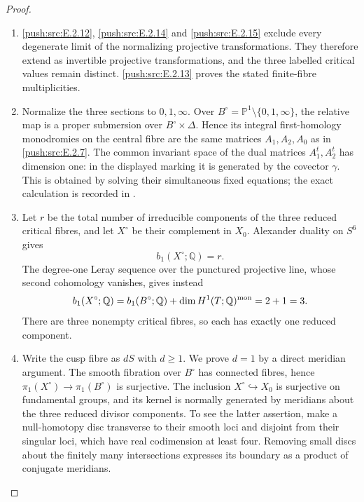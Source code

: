 \begin{proof}

\begin{enumerate}[label={$\langle1\rangle$\arabic*.},leftmargin=*]
\item \ref{push:src:E.2.12}, \ref{push:src:E.2.14} and \ref{push:src:E.2.15} exclude every degenerate
limit of the normalizing projective transformations.
They therefore extend as invertible projective
transformations, and the three labelled critical
values remain distinct.  \ref{push:src:E.2.13} proves the stated
finite-fibre multiplicities.

\item Normalize the three sections to $0,1,\infty$.
Over $B^\circ=\mathbb P^1\setminus\{0,1,\infty\}$,
the relative map is a proper submersion over
$B^\circ\times\Delta$.  Hence its integral
first-homology monodromies on the central fibre
are the same matrices $A_1,A_2,A_0$ as in
\ref{push:src:E.2.7}.  The common invariant space of the dual
matrices $A_1^t,A_2^t$ has dimension one:
in the displayed marking it is generated by
the covector $\gamma$.  This is obtained by
solving their simultaneous fixed equations;
the exact calculation is recorded in
.

\item Let $r$ be the total number of irreducible
components of the three reduced critical
fibres, and let $X^\circ$ be their complement
in $X_0$.  Alexander duality on $S^6$ gives
\[
 b_1(X^\circ;\mathbb Q)=r.
\]
The degree-one Leray sequence over the
punctured projective line, whose second
cohomology vanishes, gives instead
\[
 b_1(X^\circ;\mathbb Q)
 =b_1(B^\circ;\mathbb Q)
   +\dim H^1(T;\mathbb Q)^{\rm mon}
 =2+1=3.
\]
There are three nonempty critical fibres,
so each has exactly one reduced component.

\item Write the cusp fibre as $dS$ with $d\ge1$.
We prove $d=1$ by a direct meridian argument.
The smooth fibration over $B^\circ$ has
connected fibres, hence
$\pi_1(X^\circ)\to\pi_1(B^\circ)$ is
surjective.  The inclusion
$X^\circ\hookrightarrow X_0$ is surjective
on fundamental groups, and its kernel is
normally generated by meridians about the
three reduced divisor components.  To see
the latter assertion, make a null-homotopy
disc transverse to their smooth loci and
disjoint from their singular loci, which
have real codimension at least four.
Removing small discs about the finitely
many intersections expresses its boundary
as a product of conjugate meridians.


\end{enumerate}
\end{proof}
